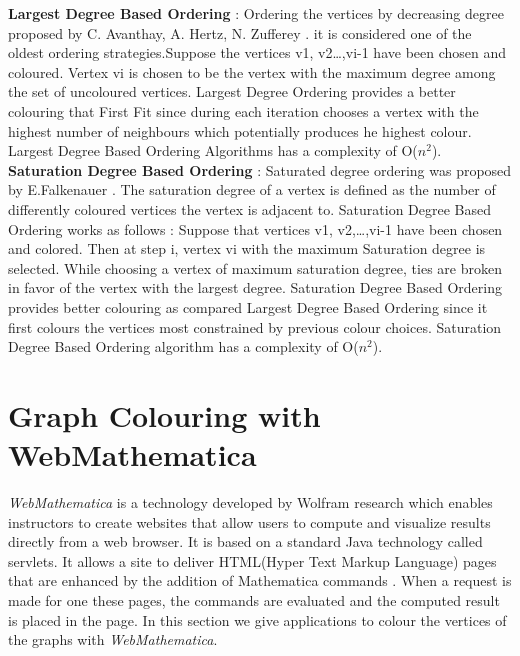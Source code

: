 \documentclass{article}
\begin{document}
\textbf{Largest Degree Based Ordering} : Ordering the vertices by decreasing degree proposed by C. Avanthay, A. Hertz, N. Zufferey \cite{5}. it is considered one of the oldest ordering strategies.Suppose the vertices v1, v2…,vi-1 have been chosen and coloured. Vertex vi is chosen to be the vertex with the maximum degree among the set of uncoloured vertices. Largest Degree Ordering provides a better colouring that First Fit since during each iteration  chooses a vertex with the highest number of neighbours which potentially produces he highest colour. Largest Degree Based Ordering Algorithms has a complexity of O($n^{2}$). 
\textbf{Saturation Degree Based Ordering} :  Saturated degree ordering was proposed by E.Falkenauer \cite{6}. The saturation degree of a vertex is defined as the number of differently coloured vertices the vertex is adjacent to.  Saturation Degree Based Ordering works as follows :  Suppose that vertices v1, v2,…,vi-1 have been chosen and colored. Then at step i, vertex vi with the maximum Saturation degree is selected. While choosing a vertex of maximum saturation degree, ties are broken in favor of the vertex with the largest degree. \hfill \break
Saturation Degree Based Ordering provides better colouring as compared Largest Degree Based Ordering since it first colours the vertices most constrained by previous colour choices. Saturation Degree Based Ordering algorithm has a complexity of O($n^{2}$).

\section{Graph Colouring with WebMathematica}
\textit{WebMathematica} is a technology developed by Wolfram research which enables instructors to create websites that allow users to compute and visualize results directly from a web browser. It is based on a standard Java technology called servlets. It allows a site to deliver HTML(Hyper Text Markup Language) pages that are enhanced by the addition of Mathematica commands \cite{2}. When a request is made for one these pages, the commands are evaluated and the computed result is placed in the page. \hfill \break In this section we give applications to colour the vertices of the graphs with \textit{WebMathematica}.
\end{document}
